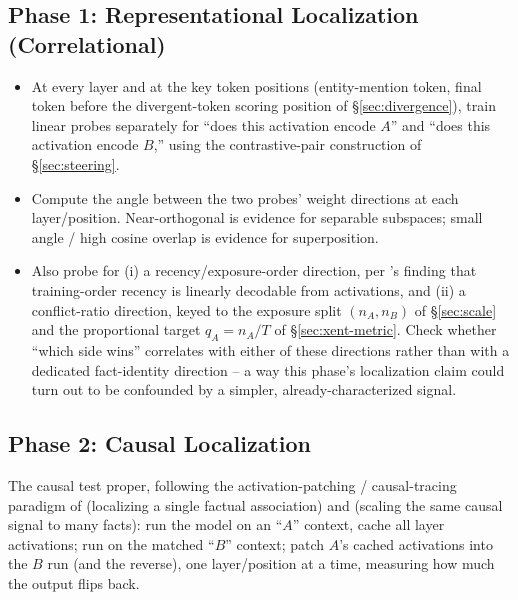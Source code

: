 \documentclass[11pt]{article}
\begin{document}
\subsection{Phase 1: Representational Localization (Correlational)}
\label{sec:mechinterp-reploc}

\begin{itemize}
  \item At every layer and at the key token positions (entity-mention token,
    final token before the divergent-token scoring position of
    \S\ref{sec:divergence}), train linear probes separately for ``does this
    activation encode $A$'' and ``does this activation encode $B$,'' using
    the contrastive-pair construction of \S\ref{sec:steering}.
  \item Compute the angle between the two probes' weight directions at each
    layer/position. Near-orthogonal is evidence for separable subspaces;
    small angle / high cosine overlap is evidence for superposition.
  \item Also probe for (i) a recency/exposure-order direction, per
    \citet{krasheninnikov2025freshinmemory}'s finding that training-order
    recency is linearly decodable from activations, and (ii) a
    conflict-ratio direction, keyed to the exposure split $(n_A, n_B)$ of
    \S\ref{sec:scale} and the proportional target $q_A = n_A/T$ of
    \S\ref{sec:xent-metric}. Check whether ``which side wins'' correlates
    with either of these directions rather than with a dedicated
    fact-identity direction -- a way this phase's localization claim could
    turn out to be confounded by a simpler, already-characterized signal.
\end{itemize}

\subsection{Phase 2: Causal Localization}
\label{sec:mechinterp-causal}

The causal test proper, following the activation-patching / causal-tracing
paradigm of \citet{meng2022rome} (localizing a single factual association)
and \citet{meng2023memit} (scaling the same causal signal to many facts):
run the model on an ``$A$'' context, cache all layer activations; run on the
matched ``$B$'' context; patch $A$'s cached activations into the $B$ run (and
the reverse), one layer/position at a time, measuring how much the output
flips back.
\end{document}
